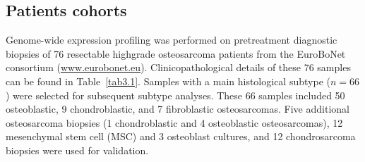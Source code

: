 \subsection{Patients cohorts}
Genome\hyp{}wide expression profiling was performed on
pretreatment diagnostic biopsies of 76 resectable highgrade
osteosarcoma patients from the EuroBoNet consortium
(\url{www.eurobonet.eu}). Clinicopathological
details of these 76 samples can be found in Table~\ref{tab3.1}.
Samples with a main histological subtype ($n=66$) were
selected for subsequent subtype analyses. These 66 samples
included 50 osteoblastic, 9 chondroblastic, and 7
fibroblastic osteosarcomas. Five additional osteosarcoma
biopsies (1 chondroblastic and 4 osteoblastic osteosarcomas),
12 mesenchymal stem cell (MSC) and 3 osteoblast
cultures, and 12 chondrosarcoma biopsies were used for
validation.
%
